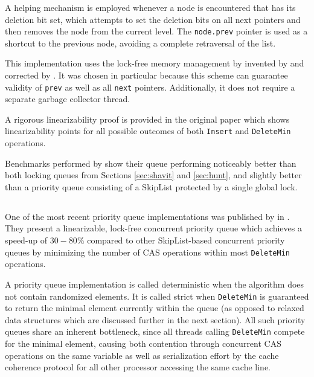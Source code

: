 \documentclass[a4paper,10pt]{article}
\begin{document}
A helping mechanism is employed whenever a node is encountered that has its deletion bit set, which attempts
to set the deletion bits on all next pointers and then removes the node from the current level. The
\lstinline|node.prev| pointer is used as a shortcut to the previous node, avoiding a complete retraversal
of the list.


This implementation uses the lock-free memory management by invented by \citeauthor{valois1996lock}
\cite{valois1995lock,valois1996lock} and corrected by \citeauthor{michael1995correction} 
\cite{michael1995correction}. It was chosen in particular because this scheme can guarantee validity
of \lstinline|prev| as well as all \lstinline|next| pointers. Additionally, it does not require a separate
garbage collector thread.

A rigorous linearizability proof is provided in the original paper \cite{sundell2003fast} which shows
linearizability points for all possible outcomes of both \lstinline|Insert| and \lstinline|DeleteMin|
operations.


Benchmarks performed by \citeauthor{sundell2003fast} show their queue performing noticeably better than both locking 
queues from Sections \ref{sec:shavit} and \ref{sec:hunt}, and slightly better than a priority queue
consisting of a SkipList protected by a single global lock.

\subsection{\citeauthor{linden2013skiplist}} \label{sec:linden}

One of the most recent priority queue implementations was published by \citeauthor{linden2013skiplist}
in \citeyear{linden2013skiplist} \cite{linden2013skiplist}. They present a linearizable, lock-free concurrent priority
queue which achieves a speed-up of $30-80\%$ compared to other SkipList-based concurrent priority queues by
minimizing the number of \ac{CAS} operations within most \lstinline|DeleteMin| operations.

A priority queue implementation is called deterministic when the algorithm does not contain randomized elements.
It is called strict when \lstinline|DeleteMin| is guaranteed to return the minimal element currently within the queue
(as opposed to relaxed data structures which are discussed further in the next section).
All such priority queues share an inherent bottleneck, since all threads calling \lstinline|DeleteMin| compete
for the minimal element, causing both contention through concurrent \ac{CAS} operations on the same variable
as well as serialization effort by the cache coherence protocol for all other processor accessing the same cache
line.
\end{document}
